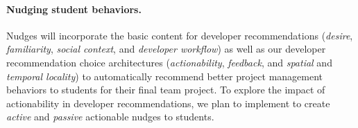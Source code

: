 

\paragraph{Nudging student behaviors.}

Nudges will incorporate the basic content for developer recommendations (\textit{desire}, \textit{familiarity}, \textit{social context}, and \textit{developer workflow}) as well as our developer recommendation choice architectures (\textit{actionability}, \textit{feedback}, and \textit{spatial} and \textit{temporal locality}) to automatically recommend better project management behaviors to students for their final team project. To explore the impact of actionability in developer recommendations, we plan to implement \TOOL to create \textit{active} and \textit{passive} actionable nudges to students.

